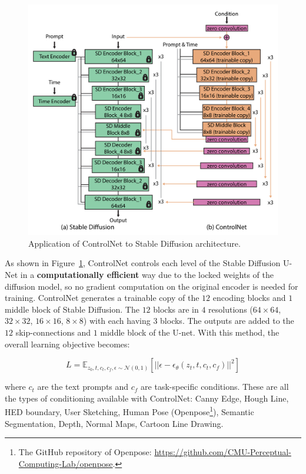 \documentclass[sn-mathphys,Numbered]{sn-jnl}
\theoremstyle{thmstyleone}%
\theoremstyle{thmstyletwo}%
\theoremstyle{thmstylethree}%
\begin{document}
\begin{figure}[t]
	\centering
    \includegraphics[scale=0.8]{img/svg/Controlnet2.png}
	\caption{Application of ControlNet to Stable Diffusion architecture.}\label{fig:controlnet-2}
\end{figure}


As shown in Figure~\ref{fig:controlnet-2}, ControlNet controls each level of the Stable Diffusion U-Net in a \textbf{computationally efficient} way due to the locked weights of the diffusion model, so no gradient computation on the original encoder is needed for training. 
ControlNet generates a trainable copy of the $12$ encoding blocks and $1$ middle block of Stable Diffusion. The $12$ blocks are in $4$ resolutions ($64 \times 64$, $32 \times 32$, $16 \times 16$, $8 \times 8$) with each having $3$ blocks. The outputs are added to the $12$ skip-connections and $1$ middle block of the U-net. With this method, the overall learning objective becomes:

\begin{equation}
	L = \mathbb{E}_{z_0,t,c_t,c_f,\epsilon \sim \mathcal{N}(0,1)}\left[||\epsilon-\epsilon_\theta(z_t,t,c_t,c_f)||^2 \right]
\end{equation}

\noindent where $c_t$ are the text prompts and $c_f$ are task-specific conditions. These are all the types of conditioning available with ControlNet: Canny Edge, Hough Line, HED boundary, User Sketching, Human Pose (Openpose\footnote{The GitHub repository of Openpose: \url{https://github.com/CMU-Perceptual-Computing-Lab/openpose}.}), Semantic Segmentation, Depth, Normal Maps, Cartoon Line Drawing.
\end{document}
